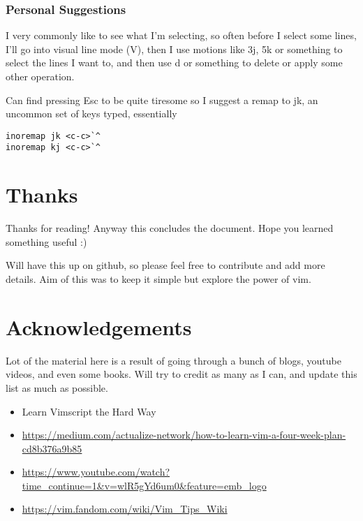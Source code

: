 \documentclass[12pt, letterpaper]{article}
\begin{document}
\subsubsection{Personal Suggestions}
I very commonly like to see what I'm selecting, so often before I select some lines, I'll go into visual line mode (V), then I use motions like 3j, 5k or something to select the lines I want to, and then use d or something to delete or apply some other operation.


Can find pressing Esc to be quite tiresome so I suggest a remap to jk, an uncommon set of keys typed, essentially 

\begin{verbatim}
inoremap jk <c-c>`^
inoremap kj <c-c>`^
\end{verbatim}

\section{Thanks}
Thanks for reading! Anyway this concludes the document. Hope you learned something useful :)

Will have this up on github, so please feel free to contribute and add more details. Aim of this was to keep it simple but explore the power of vim.

\section{Acknowledgements}
Lot of the material here is a result of going through a bunch of blogs, youtube videos, and even some books. Will try to credit as many as I can, and update this list as much as possible.

\begin{itemize}
    \item Learn Vimscript the Hard Way
    \item \url{https://medium.com/actualize-network/how-to-learn-vim-a-four-week-plan-cd8b376a9b85}
    \item \url{https://www.youtube.com/watch?time_continue=1&v=wlR5gYd6um0&feature=emb_logo}
    \item \url{https://vim.fandom.com/wiki/Vim_Tips_Wiki}
\end{itemize}
\end{document}
